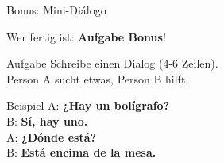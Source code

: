 \documentclass[aspectratio=169, 11pt]{beamer}
\newcommand{\es}[1]{\textbf{\textcolor{spanischrot}{#1}}}
\newcommand{\estar}[1]{\textbf{\textcolor{blau}{#1}}}
\begin{document}
\begin{frame}{Bonus: Mini-Diálogo}

\begin{center}
{\Large Wer fertig ist: \textbf{Aufgabe Bonus}!}
\end{center}

\vspace{0.5cm}

\begin{block}{Aufgabe}
Schreibe einen Dialog (4-6 Zeilen).\\
Person A sucht etwas, Person B hilft.
\end{block}

\vspace{0.5cm}

\begin{block}{Beispiel}
A: \es{¿Hay un bolígrafo?}\\
B: \es{Sí, hay uno.}\\
A: \estar{¿Dónde está?}\\
B: \estar{Está encima de la mesa.}
\end{block}

\end{frame}
\end{document}
